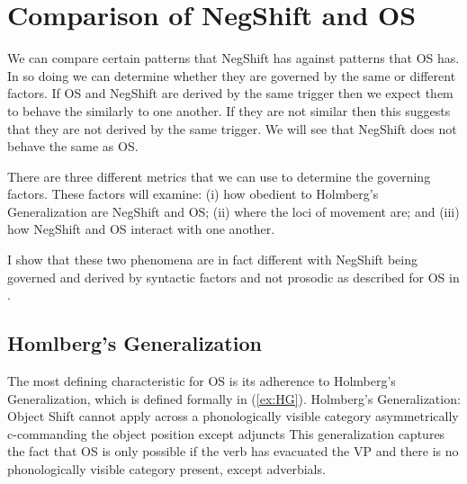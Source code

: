 \documentclass[12pt, letterpaper]{article}
\begin{document}
\section{Comparison of NegShift and OS} \label{sec:NEG-OS}
We can compare certain patterns that NegShift has against patterns that OS has. In so doing we can determine whether they are governed by the same or different factors. If OS and NegShift are derived by the same trigger then we expect them to behave the similarly to one another. If they are not similar then this suggests that they are not derived by the same trigger. We will see that NegShift does not behave the same as OS.

There are three different metrics that we can use to determine the governing factors. These factors will examine: (i) how obedient to Holmberg's Generalization are NegShift and OS; (ii) where the loci of movement are; and (iii) how NegShift and OS interact with one another.   

I show that these two phenomena are in fact different with NegShift being governed and derived by syntactic factors and not prosodic as described for OS in \citet{erteschik-shirSoundPatternsSyntax2005,erteschik-shirScandinavianObjectShift2017,erteschik-shirVariationMainlandScandinavian2020,brinkerhoffMATCHINGPhrasesNorwegian2021}.  

\subsection{Homlberg's Generalization} \label{sec:HG}

The most defining characteristic for OS is its adherence to Holmberg's Generalization, which is defined formally in (\ref{ex:HG}).  
\ea \label{ex:HG} {Holmberg's Generalization:\\
Object Shift cannot apply across a phonologically visible category asymmetrically c-commanding the object position except adjuncts} 
\z
This generalization captures the fact that OS is only possible if the verb has evacuated the VP and there is no phonologically visible category present, except adverbials. 
\end{document}

